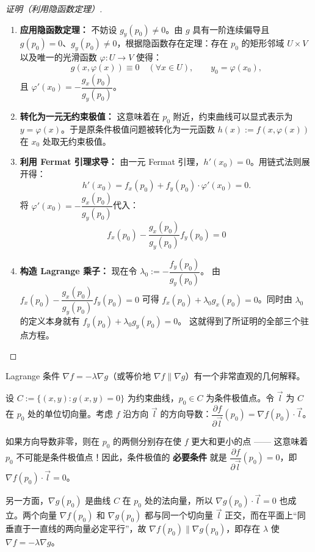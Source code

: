 \documentclass[lang=cn,11pt]{elegantbook}
\begin{document}
\begin{proof}[证明（利用隐函数定理）] \label{proof:lagrange-proof}
\begin{enumerate}
  \item \textbf{应用隐函数定理：} 不妨设 $g_y(p_0) \neq 0$。由 $g$ 具有一阶连续偏导且 $g(p_0)=0$、$g_y(p_0) \neq 0$，根据隐函数存在定理：存在 $p_0$ 的矩形邻域 $U\times V$ 以及唯一的光滑函数 $\varphi:U\to V$ 使得：
  \[
  g(x,\varphi(x))\equiv 0\quad(\forall x\in U),\qquad y_0=\varphi(x_0),
  \]
  且 $\varphi'(x_0)=-\dfrac{g_x(p_0)}{g_y(p_0)}$。  
  
  \item \textbf{转化为一元无约束极值：} 这意味着在 $p_0$ 附近，约束曲线可以显式表示为 $y=\varphi(x)$。于是原条件极值问题被转化为一元函数 $h(x):=f(x,\varphi(x))$ 在 $x_0$ 处取无约束极值。
  
  \item \textbf{利用 Fermat 引理求导：} 由一元 Fermat 引理，$h'(x_0)=0$。用链式法则展开得：
  \[
  h'(x_0)=f_x(p_0)+f_y(p_0)\cdot\varphi'(x_0)=0.
  \]
  将 $\varphi'(x_0)=-\dfrac{g_x(p_0)}{g_y(p_0)}$代入：
  \[
  f_x(p_0)-\frac{g_x(p_0)}{g_y(p_0)}f_y(p_0)=0
  \]
  
  \item \textbf{构造 Lagrange 乘子：} 现在令 $\lambda_0:=-\dfrac{f_y(p_0)}{g_y(p_0)}$。
  由 $f_x(p_0)-\dfrac{g_x(p_0)}{g_y(p_0)}f_y(p_0)=0$ 可得 $f_x(p_0)+\lambda_0 g_x(p_0)=0$。同时由 $\lambda_0$ 的定义本身就有 $f_y(p_0)+\lambda_0 g_y(p_0)=0$。
  这就得到了所证明的全部三个驻点方程。
\end{enumerate}
\end{proof}

\begin{remark} \label{remark:lagrange-geometry}
Lagrange 条件 $\nabla f=-\lambda\nabla g$（或等价地 $\nabla f \parallel \nabla g$）有一个非常直观的几何解释。

设 $C:=\{(x,y):g(x,y)=0\}$ 为约束曲线，$p_0\in C$ 为条件极值点。令 $\vec l$ 为 $C$ 在 $p_0$ 处的单位切向量。考虑 $f$ 沿方向 $\vec l$ 的方向导数：$\dfrac{\partial f}{\partial\vec l}(p_0)= \nabla f(p_0)\cdot\vec l$。

如果方向导数非零，则在 $p_0$ 的两侧分别存在使 $f$ 更大和更小的点 —— 这意味着 $p_0$ 不可能是条件极值点！因此，条件极值的 \textbf{必要条件} 就是 $\dfrac{\partial f}{\partial\vec l}(p_0)=0$，即 $\nabla f(p_0)\cdot\vec l=0$。

另一方面，$\nabla g(p_0)$ 是曲线 $C$ 在 $p_0$ 处的法向量，所以 $\nabla g(p_0)\cdot\vec l=0$ 也成立。两个向量 $\nabla f(p_0)$ 和 $\nabla g(p_0)$ 都与同一个切向量 $\vec l$ 正交，而在平面上“同垂直于一直线的两向量必定平行”，故 $\nabla f(p_0) \parallel \nabla g(p_0)$，即存在 $\lambda$ 使 $\nabla f=-\lambda\nabla g$。
\end{remark}
\end{document}
